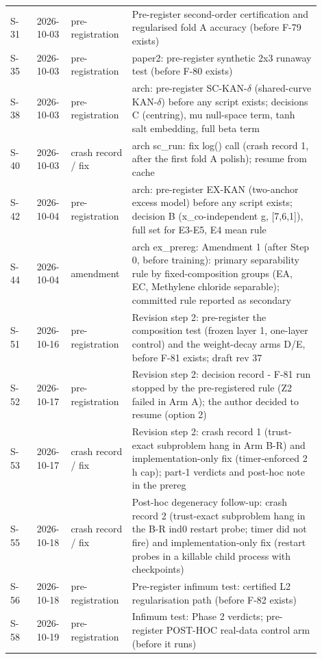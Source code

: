 {\begin{longtable}{R{0.08\linewidth} R{0.10\linewidth} R{0.14\linewidth} R{0.58\linewidth}}
S-31 & 2026-10-03 & pre-registration & Pre-register second-order certification and regularised fold A accuracy (before F-79 exists) \\
S-35 & 2026-10-03 & pre-registration & paper2: pre-register synthetic 2x3 runaway test (before F-80 exists) \\
S-38 & 2026-10-03 & pre-registration & arch: pre-register SC-KAN-$\delta$ (shared-curve KAN-$\delta$) before any script exists; decisions C (centring), mu null-space term, tanh salt embedding, full beta term \\
S-40 & 2026-10-03 & crash record / fix & arch sc\_run: fix log() call (crash record 1, after the first fold A polish); resume from cache \\
S-42 & 2026-10-04 & pre-registration & arch: pre-register EX-KAN (two-anchor excess model) before any script exists; decision B (x\_co-independent g, [7,6,1]), full set for E3-E5, E4 mean rule \\
S-44 & 2026-10-04 & amendment & arch ex\_prereg: Amendment 1 (after Step 0, before training): primary separability rule by fixed-composition groups (EA, EC, Methylene chloride separable); committed rule reported as secondary \\
S-51 & 2026-10-16 & pre-registration & Revision step 2: pre-register the composition test (frozen layer 1, one-layer control) and the weight-decay arms D/E, before F-81 exists; draft rev 37 \\
S-52 & 2026-10-17 & pre-registration & Revision step 2: decision record - F-81 run stopped by the pre-registered rule (Z2 failed in Arm A); the author decided to resume (option 2) \\
S-53 & 2026-10-17 & crash record / fix & Revision step 2: crash record 1 (trust-exact subproblem hang in Arm B-R) and implementation-only fix (timer-enforced 2 h cap); part-1 verdicts and post-hoc note in the prereg \\
S-55 & 2026-10-18 & crash record / fix & Post-hoc degeneracy follow-up: crash record 2 (trust-exact subproblem hang in the B-R ind0 restart probe; timer did not fire) and implementation-only fix (restart probes in a killable child process with checkpoints) \\
S-56 & 2026-10-18 & pre-registration & Pre-register infimum test: certified L2 regularisation path (before F-82 exists) \\
S-58 & 2026-10-19 & pre-registration & Infimum test: Phase 2 verdicts; pre-register POST-HOC real-data control arm (before it runs) \\

\end{longtable}}
